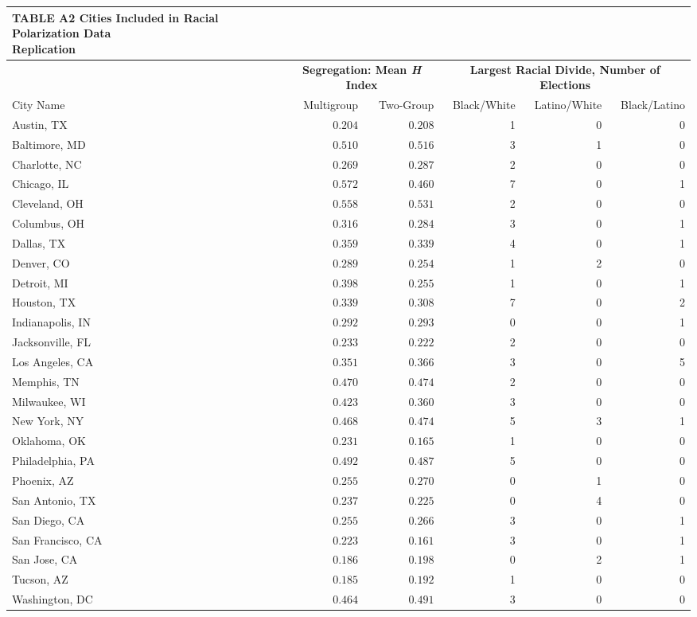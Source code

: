 \documentclass[]{article}
\begin{document}
\captionsetup[table]{labelformat=empty,skip=1pt}
\begin{longtable}{lrrrrr}
\caption*{
\large \textbf{TABLE A2 Cities Included in Racial Polarization Data}\\ 
\small Replication\\ 
} \\ 
\toprule
& \multicolumn{2}{c}{\textbf{Segregation: Mean \emph{H} Index}} & \multicolumn{3}{c}{\textbf{Largest Racial Divide, Number of Elections}} \\ 
 \cmidrule(lr){2-3}\cmidrule(lr){4-6}
City Name & Multigroup & Two-Group & Black/White & Latino/White & Black/Latino \\ 
\midrule
Austin, TX & $0.204$ & $0.208$ & 1 & 0 & 0 \\ 
Baltimore, MD & $0.510$ & $0.516$ & 3 & 1 & 0 \\ 
Charlotte, NC & $0.269$ & $0.287$ & 2 & 0 & 0 \\ 
Chicago, IL & $0.572$ & $0.460$ & 7 & 0 & 1 \\ 
Cleveland, OH & $0.558$ & $0.531$ & 2 & 0 & 0 \\ 
Columbus, OH & $0.316$ & $0.284$ & 3 & 0 & 1 \\ 
Dallas, TX & $0.359$ & $0.339$ & 4 & 0 & 1 \\ 
Denver, CO & $0.289$ & $0.254$ & 1 & 2 & 0 \\ 
Detroit, MI & $0.398$ & $0.255$ & 1 & 0 & 1 \\ 
Houston, TX & $0.339$ & $0.308$ & 7 & 0 & 2 \\ 
Indianapolis, IN & $0.292$ & $0.293$ & 0 & 0 & 1 \\ 
Jacksonville, FL & $0.233$ & $0.222$ & 2 & 0 & 0 \\ 
Los Angeles, CA & $0.351$ & $0.366$ & 3 & 0 & 5 \\ 
Memphis, TN & $0.470$ & $0.474$ & 2 & 0 & 0 \\ 
Milwaukee, WI & $0.423$ & $0.360$ & 3 & 0 & 0 \\ 
New York, NY & $0.468$ & $0.474$ & 5 & 3 & 1 \\ 
Oklahoma, OK & $0.231$ & $0.165$ & 1 & 0 & 0 \\ 
Philadelphia, PA & $0.492$ & $0.487$ & 5 & 0 & 0 \\ 
Phoenix, AZ & $0.255$ & $0.270$ & 0 & 1 & 0 \\ 
San Antonio, TX & $0.237$ & $0.225$ & 0 & 4 & 0 \\ 
San Diego, CA & $0.255$ & $0.266$ & 3 & 0 & 1 \\ 
San Francisco, CA & $0.223$ & $0.161$ & 3 & 0 & 1 \\ 
San Jose, CA & $0.186$ & $0.198$ & 0 & 2 & 1 \\ 
Tucson, AZ & $0.185$ & $0.192$ & 1 & 0 & 0 \\ 
Washington, DC & $0.464$ & $0.491$ & 3 & 0 & 0 \\ 
\bottomrule
\end{longtable}
\end{document}
